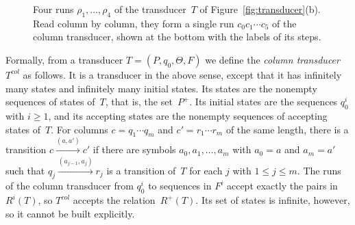 \begin{figure}[t]
\centering
{}
\caption{Four runs $\rho_1, \ldots, \rho_4$ of the transducer~$T$ of
Figure~\ref{fig:transducer}(b). Read column by column, they form a single run
$c_0 c_1 \cdots c_5$ of the column transducer, shown at the bottom with the
labels of its steps.}
\label{fig:columns}
\end{figure}

Formally, from a transducer $T = (P, q_0, \Theta, F)$ we define the
\emph{column transducer} $T^{\mathit{col}}$ as follows. It is a transducer in
the above sense, except that it has infinitely many states and infinitely many
initial states. Its states are the
nonempty sequences of states of~$T$, that is, the set~$P^+$. Its initial
states are the sequences $q_0^i$ with $i \geq 1$, and its accepting states are
the nonempty sequences of accepting states of~$T$. For columns $c = q_1 \cdots
q_m$ and $c' = r_1 \cdots r_m$ of the same length, there is a transition $c
\xrightarrow{(a,a')} c'$ if there are symbols $a_0, a_1, \ldots, a_m$ with
$a_0 = a$ and $a_m = a'$ such that $q_j \xrightarrow{(a_{j-1},a_j)} r_j$ is a
transition of~$T$ for each $j$ with $1 \leq j \leq m$. The runs of the column
transducer from $q_0^i$ to sequences in $F^i$ accept exactly the pairs
in~$R^i(T)$, so $T^{\mathit{col}}$ accepts the relation~$R^+(T)$. Its set of
states is infinite, however, so it cannot be built explicitly.

